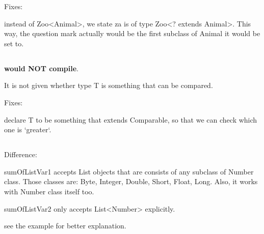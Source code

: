 	\begin{paracol}{2}
		
		\switchcolumn
		Fixes:
		\begin{compactitem}
			\item instead of Zoo<Animal>, we state za is of type Zoo<? extends Animal>. This way, the question mark actually would be the first subclass of Animal it would be set to.
		\end{compactitem}
	\end{paracol}


\subsection{}

	\begin{paracol}{2}
		
		\switchcolumn
		\textbf{would NOT compile}.
		\begin{compactitem}
			\item It is not given whether type T is something that can be compared. 
		\end{compactitem}
	\end{paracol}
	\bigskip
	
	\begin{paracol}{2}
		
		\switchcolumn
		Fixes:
		\begin{compactitem}
			\item declare T to be something that extends Comparable, so that we can check which one is `greater`.
		\end{compactitem}
	\end{paracol}


\subsection{}

	\begin{paracol}{2}
		
		\switchcolumn
		Difference:
		\begin{compactitem}
			\item sumOfListVar1 accepts List objects that are consists of any subclass of Number class. Those classes are: Byte, Integer, Double, Short, Float, Long. Also, it works with Number class itself too.
			
			\item sumOfListVar2 only accepts List<Number> explicitly.
			
			\item see the example for better explanation.
		\end{compactitem}
	\end{paracol}
	\bigskip
	

